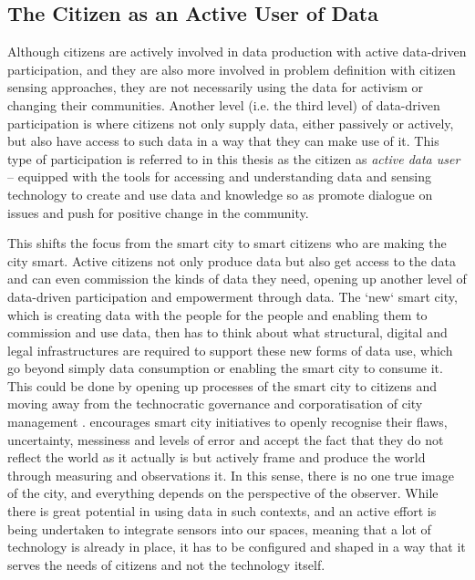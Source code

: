 \subsection{The Citizen as an Active User of Data}
\label{sub:active-user}
Although citizens are actively involved in data production with active data-driven participation, and they are also more involved in problem definition with citizen sensing approaches, they are not necessarily using the data for activism or changing their communities. Another level (i.e. the third level) of data-driven participation is where citizens not only supply data, either passively or actively, but also have access to such data in a way that they can make use of it. This type of participation is referred to in this thesis as the citizen as \textit{active data user} -- equipped with the tools for accessing and understanding data and sensing technology to create and use data and knowledge so as promote dialogue on issues and push for positive change in the community. 

This shifts the focus from the smart city to smart citizens who are making the city smart. Active citizens not only produce data but also get access to the data and can even commission the kinds of data they need, opening up another level of data-driven participation and empowerment through data. The `new` smart city, which is creating data with the people for the people and enabling them to commission and use data, then has to think about what structural, digital and legal infrastructures are required to support these new forms of data use, which go beyond simply data consumption or enabling the smart city to consume it. This could be done by opening up processes of the smart city to citizens and moving away from the technocratic governance and corporatisation of city management \citep{kitchin_real-time_2014}. \cite{kitchin_knowing_2015} encourages smart city initiatives to openly recognise their flaws, uncertainty, messiness and levels of error and accept the fact that they do not reflect the world as it actually is but actively frame and produce the world through measuring and observations it. In this sense, there is no one true image of the city, and everything depends on the perspective of the observer. While there is great potential in using data in such contexts, and an active effort is being undertaken to integrate sensors into our spaces, meaning that a lot of technology is already in place, it has to be configured and shaped in a way that it serves the needs of citizens and not the technology itself.

